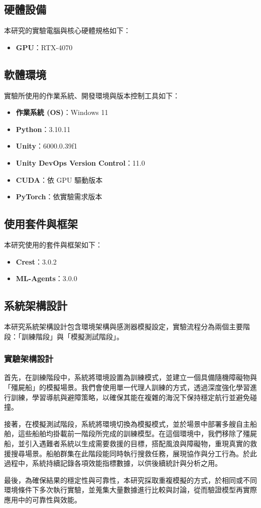\documentclass[12pt,a4paper]{ctexart}
\begin{document}
\subsection{硬體設備}
本研究的實驗電腦與核心硬體規格如下：
\begin{itemize}
  	\item \textbf{GPU}：RTX-4070
\end{itemize}

\subsection{軟體環境}
實驗所使用的作業系統、開發環境與版本控制工具如下：
\begin{itemize}
    \item \textbf{作業系統 (OS)}：Windows 11
    \item \textbf{Python}：3.10.11
    \item \textbf{Unity}：6000.0.39f1
    \item \textbf{Unity DevOps Version Control}：11.0
    \item \textbf{CUDA}：依 GPU 驅動版本
    \item \textbf{PyTorch}：依實驗需求版本
\end{itemize}

\subsection{使用套件與框架}
本研究使用的套件與框架如下：
\begin{itemize}
    \item \textbf{Crest}：3.0.2
    \item \textbf{ML-Agents}：3.0.0
\end{itemize}

\subsection{系統架構設計}
本研究系統架構設計包含環境架構與感測器模擬設定，實驗流程分為兩個主要階段：「訓練階段」與「模擬測試階段」。

\subsubsection{實驗架構設計}
首先，在訓練階段中，系統將環境設置為訓練模式，並建立一個具備隨機障礙物與「殭屍船」的模擬場景。我們會使用單一代理人訓練的方式，透過深度強化學習進行訓練，學習導航與避障策略，以確保其能在複雜的海況下保持穩定航行並避免碰撞。
\\ \par
接著，在模擬測試階段，系統將環境切換為模擬模式，並於場景中部署多艘自主船舶，這些船舶均掛載前一階段所完成的訓練模型。在這個環境中，我們移除了殭屍船，並引入遇難者系統以生成需要救援的目標，搭配風浪與障礙物，重現真實的救援搜尋場景。船舶群集在此階段能同時執行搜救任務，展現協作與分工行為。於此過程中，系統持續記錄各項效能指標數據，以供後續統計與分析之用。
\\ \par
最後，為確保結果的穩定性與可靠性，本研究採取重複模擬的方式，於相同或不同環境條件下多次執行實驗，並蒐集大量數據進行比較與討論，從而驗證模型再實際應用中的可靠性與效能。
\end{document}
